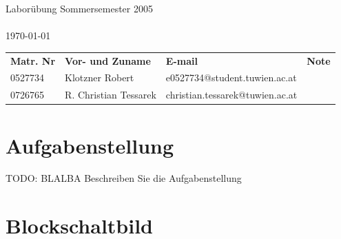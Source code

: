 \documentclass[a4paper,10pt]{scrartcl}
\begin{document}
\begin{titlepage}
\begin{center}
\begin{Large}

\sffamily \vspace*{\fill}{Institut f\"ur Computertechnik\\
Labor integrierte Schaltungen\\
384.088\\}
\vfill { Labor\"ubung Sommersemester 2005\\}
\vspace{10mm}{Betreuer: Herr Nachtnebel}\\
\today\\
\end{Large}
\vfill

\begin{tabular}{llll}
\textbf{Matr. Nr} & \textbf{Vor- und Zuname} & \textbf{E-mail} & \textbf{Note} \\
0527734 & Klotzner Robert & e0527734@student.tuwien.ac.at &  \\
0726765 & R. Christian Tessarek & christian.tessarek@tuwien.ac.at &
\end{tabular}

\end{center}
\end{titlepage}



\pagebreak
\tableofcontents
\pagebreak


\section{Aufgabenstellung}
\label{sec:aufgabe}
TODO: BLALBA Beschreiben Sie die Aufgabenstellung


\section{Blockschaltbild}
\label{sec:block}

\end{document}
